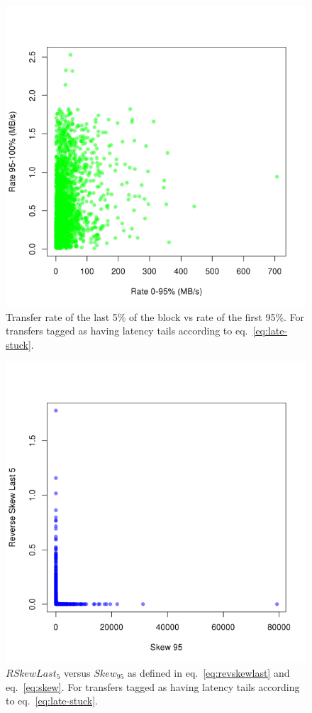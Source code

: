 \begin{figure}[htp]
\centering
\includegraphics{Figures/figure-51.pdf}
\caption{Transfer rate of the last 5\% of the block vs rate of the
  first 95\%. For transfers tagged as having latency tails according to
  eq.~\ref{eq:late-stuck}.}\label{fig:figure-5.1}
\end{figure}

\begin{figure}[htp]
\centering
\includegraphics{Figures/figure-52.pdf}
\caption{$RSkewLast_5$ versus $Skew_{95}$ as defined in
  eq.~\ref{eq:revskewlast} and eq.~\ref{eq:skew}. For transfers tagged as
  having latency tails according to
  eq.~\ref{eq:late-stuck}.}\label{fig:figure-5.2}
\end{figure}

